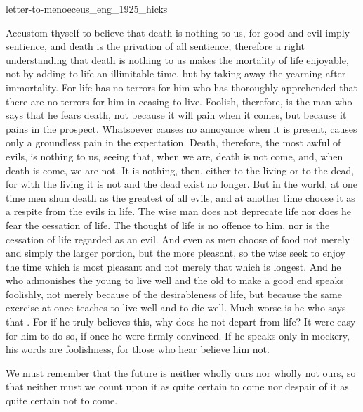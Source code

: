 \documentclass{stex}
\begin{document}
\begin{smodule}{letter-to-menoeceus_eng_1925_hicks}
\begin{sparagraph}[id=letter-to-menoeceus,name=Letter to Menoeceus]
  Accustom thyself to believe that death is nothing to us, for good and evil imply sentience, and death is the privation of all sentience; therefore a right understanding that death is nothing to us makes the mortality of life enjoyable, not by adding to life an illimitable time, but by taking away the yearning after immortality.
  For life has no terrors for him who has thoroughly apprehended that there are no terrors for him in ceasing to live.
  Foolish, therefore, is the man who says that he fears death, not because it will pain when it comes, but because it pains in the prospect.
  Whatsoever causes no annoyance when it is present, causes only a groundless pain in the expectation.
  Death, therefore, the most awful of evils, is nothing to us, seeing that, when we are, death is not come, and, when death is come, we are not.
  It is nothing, then, either to the living or to the dead, for with the living it is not and the dead exist no longer. But in the world, at one time men shun death as the greatest of all evils, and at another time choose it as a respite from the evils in life.
  The wise man does not deprecate life nor does he fear the cessation of life.
  The thought of life is no offence to him, nor is the cessation of life regarded as an evil.
  And even as men choose of food not merely and simply the larger portion, but the more pleasant, so the wise seek to enjoy the time which is most pleasant and not merely that which is longest.
  And he who admonishes the young to live well and the old to make a good end speaks foolishly, not merely because of the desirableness of life, but because the same exercise at once teaches to live well and to die well.
  Much worse is he who says that .
  For if he truly believes this, why does he not depart from life? It were easy for him to do so, if once he were firmly convinced.
  If he speaks only in mockery, his words are foolishness, for those who hear believe him not.

  We must remember that the future is neither wholly ours nor wholly not ours, so that neither must we count upon it as quite certain to come nor despair of it as quite certain not to come.


\end{sparagraph}
\end{smodule}
\end{document}
